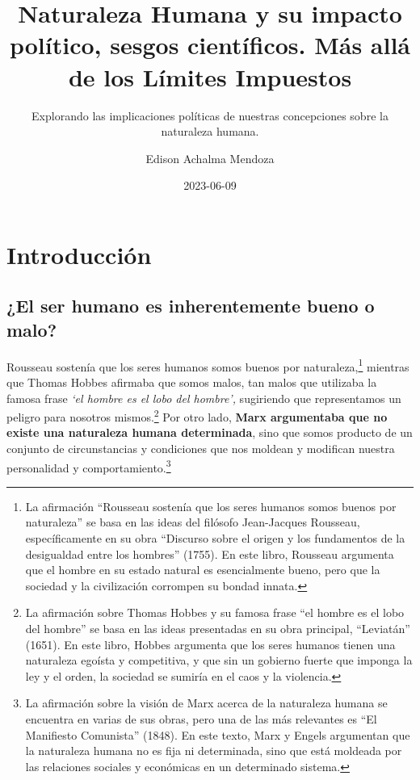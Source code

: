 \documentclass[
  letterpaper,
  DIV=11,
  numbers=noendperiod]{scrartcl}
\title{Naturaleza Humana y su impacto político, sesgos científicos. Más
allá de los Límites Impuestos}
\subtitle{Explorando las implicaciones políticas de nuestras
concepciones sobre la naturaleza humana.}
\author{Edison Achalma Mendoza}
\date{2023-06-09}
\begin{document}
\maketitle
\ifdefined\Shaded\renewenvironment{Shaded}{\begin{tcolorbox}[interior hidden, breakable, enhanced, boxrule=0pt, frame hidden, sharp corners, borderline west={3pt}{0pt}{shadecolor}]}{\end{tcolorbox}}\fi

\hypertarget{introducciuxf3n}{%
\section{Introducción}\label{introducciuxf3n}}

\hypertarget{el-ser-humano-es-inherentemente-bueno-o-malo}{%
\subsection{¿El ser humano es inherentemente bueno o
malo?}\label{el-ser-humano-es-inherentemente-bueno-o-malo}}

Rousseau sostenía que los seres humanos somos buenos por
naturaleza,\footnote{La afirmación ``Rousseau sostenía que los seres
  humanos somos buenos por naturaleza'' se basa en las ideas del
  filósofo Jean-Jacques Rousseau, específicamente en su obra ``Discurso
  sobre el origen y los fundamentos de la desigualdad entre los
  hombres'' (1755). En este libro, Rousseau argumenta que el hombre en
  su estado natural es esencialmente bueno, pero que la sociedad y la
  civilización corrompen su bondad innata.} mientras que Thomas Hobbes
afirmaba que somos malos, tan malos que utilizaba la famosa frase
\emph{`el hombre es el lobo del hombre',} sugiriendo que representamos
un peligro para nosotros mismos.\footnote{La afirmación sobre Thomas
  Hobbes y su famosa frase ``el hombre es el lobo del hombre'' se basa
  en las ideas presentadas en su obra principal, ``Leviatán'' (1651). En
  este libro, Hobbes argumenta que los seres humanos tienen una
  naturaleza egoísta y competitiva, y que sin un gobierno fuerte que
  imponga la ley y el orden, la sociedad se sumiría en el caos y la
  violencia.} Por otro lado, \textbf{Marx argumentaba que no existe una
naturaleza humana determinada}, sino que somos producto de un conjunto
de circunstancias y condiciones que nos moldean y modifican nuestra
personalidad y comportamiento.\footnote{La afirmación sobre la visión de
  Marx acerca de la naturaleza humana se encuentra en varias de sus
  obras, pero una de las más relevantes es ``El Manifiesto Comunista''
  (1848). En este texto, Marx y Engels argumentan que la naturaleza
  humana no es fija ni determinada, sino que está moldeada por las
  relaciones sociales y económicas en un determinado sistema.}
\end{document}
